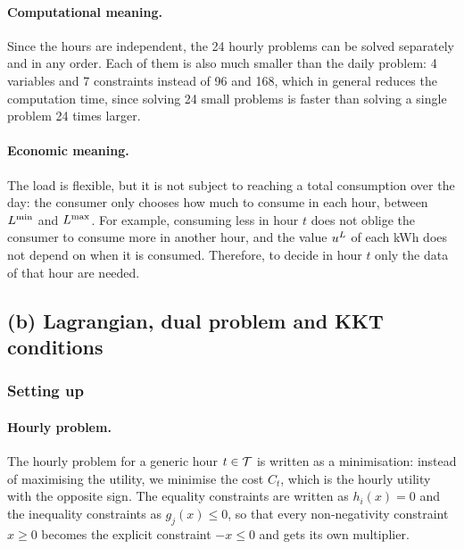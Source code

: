 \paragraph{Computational meaning.}
Since the hours are independent, the 24 hourly problems can be solved separately and in any order. Each of them is also much smaller than the daily problem: 4 variables and 7 constraints instead of 96 and 168, which in general reduces the computation time, since solving 24 small problems is faster than solving a single problem 24 times larger.

\paragraph{Economic meaning.}

The load is flexible, but it is not subject to reaching a total consumption over the day: the consumer only chooses how much to consume in each hour, between $L^{\min}$ and $L^{\max}$. For example, consuming less in hour $t$ does not oblige the consumer to consume more in another hour, and the value $u^{L}$ of each kWh does not depend on when it is consumed. Therefore, to decide in hour $t$ only the data of that hour are needed.

\subsection{(b) Lagrangian, dual problem and KKT conditions}

\subsubsection{Setting up}
\paragraph{Hourly problem.}
The hourly problem for a generic hour
$t \in \mathcal{T}$ is written as a minimisation: instead of maximising the utility, we minimise the
cost $C_t$, which is the hourly utility with the opposite sign. The equality constraints are
written as $h_i(x) = 0$ and the inequality constraints as $g_j(x) \leq 0$, so that every
non-negativity constraint $x \geq 0$ becomes the explicit constraint $-x \leq 0$ and gets its
own multiplier. 

